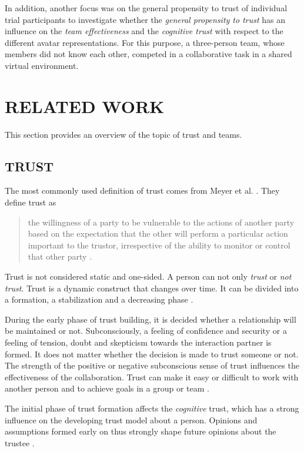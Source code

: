 \documentclass[sigchi]{acmart}
\begin{document}
In addition, another focus was on the general propensity to trust of individual trial participants to investigate whether the \textit{general propensity to trust} has an influence on the \textit{team effectiveness} and the \textit{cognitive trust} with respect to the different avatar representations. For this purpose, a three-person team, whose members did not know each other, competed in a collaborative task in a shared virtual environment.

\section{RELATED WORK}
This section provides an overview of the topic of trust and teams.
\subsection{TRUST}
The most commonly used definition of trust comes from Meyer et al. \citep[p. 712]{mayer1995integrative}. They define trust as
\begin{quote} \grqq{}the willingness of a party to be vulnerable to the actions of another party based on the expectation that the other will perform a particular action important to the trustor, irrespective of the ability to monitor or control that other party\grqq{} \citep[p. 712]{mayer1995integrative}.\end{quote}

Trust is not considered static and one-sided. A person can not only \textit{trust} or \textit{not trust}. Trust is a dynamic construct that changes over time. It can be divided into a formation, a stabilization and a decreasing phase \citep[p. 396]{rousseau1998not}.

During the early phase of trust building, it is decided whether a relationship will be maintained or not. Subconsciously, a feeling of confidence and security or a feeling of tension, doubt and skepticism towards the interaction partner is formed.
It does not matter whether the decision is made to trust someone or not. The strength of the positive or negative subconscious sense of trust influences the effectiveness of the collaboration. Trust can make it easy or difficult to work with another person and to achieve goals in a group or team \citep[p. 405-406]{bigley1998straining}.

The initial phase of trust formation affects the \textit{cognitive} trust, which has a strong influence on the developing trust model about a person.
Opinions and assumptions formed early on thus strongly shape future opinions about the trustee \citep[pp. 461-462]{baldwin1992relational}.
\end{document}
